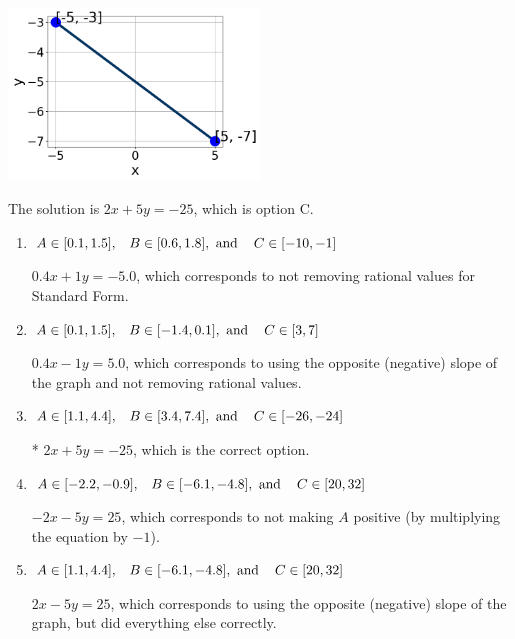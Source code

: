 \documentclass{extbook}[14pt]
\begin{document}
\begin{enumerate}
{\begin{center}
    \includegraphics[width=0.5\textwidth]{../Figures/linearGraphToStandardB.png}
\end{center}


The solution is \( 2x + 5y = -25 \), which is option C.\begin{enumerate}[label=\Alph*.]
\item \( A \in [0.1, 1.5], \hspace{3mm} B \in [0.6, 1.8], \text{ and } \hspace{3mm} C \in [-10, -1] \)

 $0.4x + 1y = -5.0$, which corresponds to not removing rational values for Standard Form.
\item \( A \in [0.1, 1.5], \hspace{3mm} B \in [-1.4, 0.1], \text{ and } \hspace{3mm} C \in [3, 7] \)

 $0.4x - 1y = 5.0$, which corresponds to using the opposite (negative) slope of the graph and not removing rational values.
\item \( A \in [1.1, 4.4], \hspace{3mm} B \in [3.4, 7.4], \text{ and } \hspace{3mm} C \in [-26, -24] \)

* $2x + 5y = -25$, which is the correct option.
\item \( A \in [-2.2, -0.9], \hspace{3mm} B \in [-6.1, -4.8], \text{ and } \hspace{3mm} C \in [20, 32] \)

 $-2x - 5y = 25$, which corresponds to not making $A$ positive (by multiplying the equation by $-1$).
\item \( A \in [1.1, 4.4], \hspace{3mm} B \in [-6.1, -4.8], \text{ and } \hspace{3mm} C \in [20, 32] \)

 $2x - 5y = 25$, which corresponds to using the opposite (negative) slope of the graph, but did everything else correctly.
\end{enumerate}

}
\end{enumerate}
\end{document}
